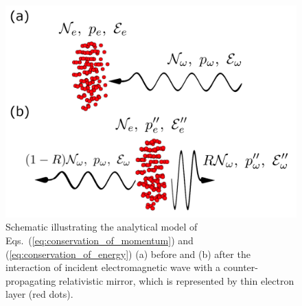 \documentclass[10pt, a4paper, twoside, openright]{report}
\begin{document}

\begin{figure}[t]
	\includegraphics[width=0.425\linewidth]{img/recoil_scheme.png}
	\caption[]{\label{fig:recoil_schematic} Schematic illustrating the analytical model of Eqs.~(\ref{eq:conservation_of_momentum}) and (\ref{eq:conservation_of_energy}) (a) before and (b) after the interaction of incident electromagnetic wave with a counter-propagating relativistic mirror, which is represented by thin electron layer (red dots).}
\end{figure}
\end{document}
